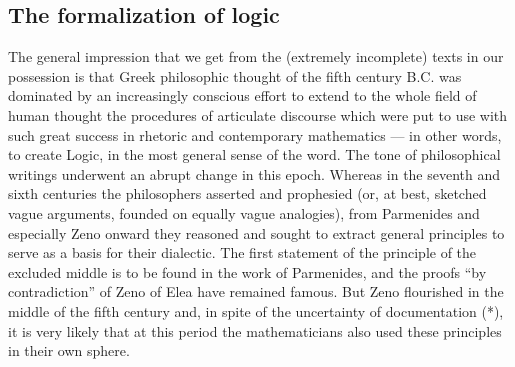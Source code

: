 \subsection*{The formalization of logic}

The general impression that we get from the (extremely incomplete) texts in our possession is that Greek philosophic thought of the fifth century B.C. was dominated by an increasingly conscious effort to extend to the whole field of human thought the procedures of articulate discourse which were put to use with such great success in rhetoric and contemporary mathematics --- in other words, to create Logic, in the most general sense of the word. The tone of philosophical writings underwent an abrupt change in this epoch. Whereas in the seventh and sixth centuries the philosophers asserted and prophesied (or, at best, sketched vague arguments, founded on equally vague analogies), from Parmenides and especially Zeno onward they reasoned and sought to extract general principles to serve as a basis for their dialectic. The first statement of the principle of the excluded middle is to be found in the work of Parmenides, and the proofs ``by contradiction'' of Zeno of Elea have remained famous. But Zeno flourished in the middle of the fifth century and, in spite of the uncertainty of documentation (*), it is very likely that at this period the mathematicians also used these principles in their own sphere.

